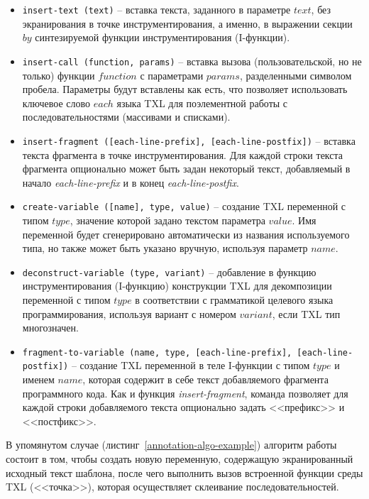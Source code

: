 \begin{itemize}[noitemsep]
  \item \lstinline{insert-text (text)} --
  вставка текста, заданного в параметре $text$, без экранирования в точке инструментирования, а именно, в выражении секции $by$ синтезируемой функции инструментирования (I-функции).

  \item \lstinline{insert-call (function, params)} --
  вставка вызова (пользовательской, но не только) функции $function$ с параметрами $params$, разделенными символом пробела. Параметры будут вставлены как есть, что позволяет использовать ключевое слово $each$ языка TXL для поэлементной работы с последовательностями (массивами и списками).

  \item \lstinline{insert-fragment ([each-line-prefix], [each-line-postfix])} --
  вставка текста фрагмента в точке инструментирования. Для каждой строки текста фрагмента опционально может быть задан некоторый текст, добавляемый в начало \textit{each-line-prefix} и в конец \textit{each-line-postfix}.

  \item \lstinline{create-variable ([name], type, value)} --
  создание TXL переменной с типом $type$, значение которой задано текстом параметра $value$. Имя переменной будет сгенерировано автоматически из названия используемого типа, но также может быть указано вручную, используя параметр $name$.

  \item \lstinline{deconstruct-variable (type, variant)} --
  добавление в функцию инструментирования (I-функцию) конструкции TXL для декомпозиции переменной с типом $type$ в соответствии с грамматикой целевого языка программирования, используя вариант с номером $variant$, если TXL тип многозначен.

  \item \lstinline{fragment-to-variable (name, type, [each-line-prefix], [each-line-postfix])} --
  создание TXL переменной в теле I-функции с типом $type$ и именем $name$, которая содержит в себе текст добавляемого фрагмента программного кода. Как и функция \textit{insert-fragment}, команда позволяет для каждой строки добавляемого текста опционально задать <<префикс>> и <<постфикс>>.
\end{itemize}

В упомянутом случае (листинг~\ref{annotation-algo-example}) алгоритм работы состоит в том, чтобы создать новую переменную, содержащую экранированный исходный текст шаблона, после чего выполнить вызов встроенной функции среды TXL (<<точка>>), которая осуществляет склеивание последовательностей.

